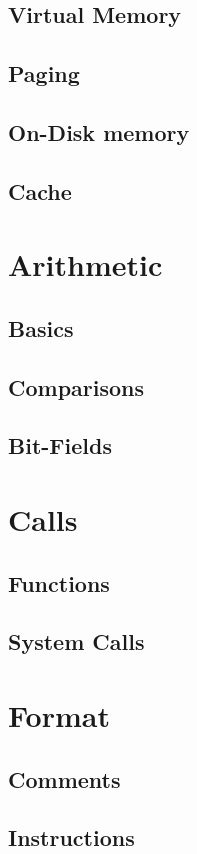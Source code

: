 \documentclass{scrartcl}
\begin{document}
        \subsection{Virtual Memory}
        \subsection{Paging}
        \subsection{On-Disk memory}
        \subsection{Cache}
    \section{Arithmetic}
        \subsection{Basics}
        \subsection{Comparisons}
        \subsection{Bit-Fields}
    \section{Calls}
        \subsection{Functions}
        \subsection{System Calls}
    \section{Format}
        \subsection{Comments}
        \subsection{Instructions}
\end{document}
